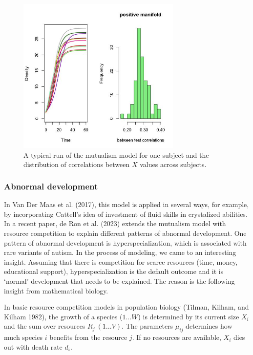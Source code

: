 \documentclass[
  letterpaper,
]{scrbook}
\begin{document}
\begin{figure}

{\centering \includegraphics[width=3.18726in,height=\textheight]{media/ch6/image7.jpg}

}

\caption{\label{fig-ch6-img7-old-76}A typical run of the mutualism model
for one subject and the distribution of correlations between \(X\)
values across subjects.}

\end{figure}

\hypertarget{abnormal-development}{%
\subsubsection{Abnormal development}\label{abnormal-development}}

In Van Der Maas et al. (2017), this model is applied in several ways,
for example, by incorporating Cattell's idea of investment of fluid
skills in crystalized abilities. In a recent paper, de Ron et al. (2023)
extends the mutualism model with resource competition to explain
different patterns of abnormal development. One pattern of abnormal
development is hyperspecialization, which is associated with rare
variants of autism. In the process of modeling, we came to an
interesting insight. Assuming that there is competition for scarce
resources (time, money, educational support), hyperspecialization is the
default outcome and it is `normal' development that needs to be
explained. The reason is the following insight from mathematical
biology.

In basic resource competition models in population biology (Tilman,
Kilham, and Kilham 1982), the growth of a species (\(1...W\)) is
determined by its current size \(X_{i}\) and the sum over resources
\(R_{j}\ (1...V)\). The parameters \(\mu_{ij}\) determines how much
species \(i\) benefits from the resource \(j\). If no resources are
available, \(X_{i}\) dies out with death rate \(d_{i}\).
\end{document}
